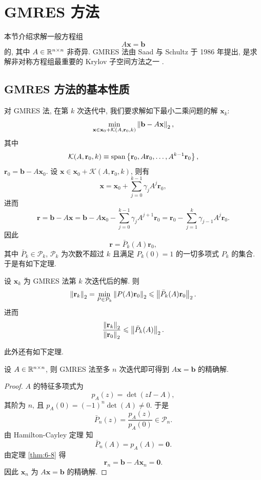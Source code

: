 \section{GMRES 方法}
\label{sec:6-5}

本节介绍求解一般方程组
\[
  A\mathbf{x}=\mathbf{b}
\]
的, 其中 $A\in\mathbb{R}^{n\times n}$ 非奇异. GMRES 法由 Saad 与 Schultz 于 1986 年提出, 是求解非对称方程组最重要的 Krylov 子空间方法之一 \cite{src:70,src:71}.

\subsection{GMRES 方法的基本性质}
\label{subsec:6-5-1}

对 GMRES 法, 在第 $k$ 次迭代中, 我们要求解如下最小二乘问题的解 $\mathbf{x}_k$:
\[
  \min_{\mathbf{x}\in\mathbf{x}_0+\mathcal{K}(A,\mathbf{r}_0,k)}
  \left\|\mathbf{b}-A\mathbf{x}\right\|_2,
\]
其中
\[
  \mathcal{K}(A,\mathbf{r}_0,k)
  \equiv\operatorname{span}\left\{\mathbf{r}_0,A\mathbf{r}_0,\ldots,A^{k-1}\mathbf{r}_0\right\},
\]
$\mathbf{r}_0=\mathbf{b}-A\mathbf{x}_0$. 设 $\mathbf{x}\in\mathbf{x}_0+\mathcal{K}(A,\mathbf{r}_0,k)$, 则有
\[
  \mathbf{x}=\mathbf{x}_0+\sum_{j=0}^{k-1}\gamma_jA^j\mathbf{r}_0,
\]
进而
\[
  \mathbf{r}=\mathbf{b}-A\mathbf{x}
  =\mathbf{b}-A\mathbf{x}_0-\sum_{j=0}^{k-1}\gamma_jA^{j+1}\mathbf{r}_0
  =\mathbf{r}_0-\sum_{j=1}^{k}\gamma_{j-1}A^j\mathbf{r}_0.
\]
因此
\[
  \mathbf{r}=\bar{P}_k(A)\mathbf{r}_0,
\]
其中 $\bar{P}_k\in\mathcal{P}_k$, $\mathcal{P}_k$ 为次数不超过 $k$ 且满足 $P_k(0)=1$ 的一切多项式 $P_k$ 的集合. 于是有如下定理.

\begin{theorem}
\label{thm:6-8}
设 $\mathbf{x}_k$ 为 GMRES 法第 $k$ 次迭代后的解. 则
\[
  \left\|\mathbf{r}_k\right\|_2=\min_{P\in\mathcal{P}_k}\left\|P(A)\mathbf{r}_0\right\|_2
  \leqslant\left\|\bar{P}_k(A)\mathbf{r}_0\right\|_2.
\]
进而
\[
  \frac{\left\|\mathbf{r}_k\right\|_2}{\left\|\mathbf{r}_0\right\|_2}
  \leqslant\left\|\bar{P}_k(A)\right\|_2.
\]
\end{theorem}

此外还有如下定理.

\begin{theorem}
\label{thm:6-9}
设 $A\in\mathbb{R}^{n\times n}$, 则 GMRES 法至多 $n$ 次迭代即可得到 $A\mathbf{x}=\mathbf{b}$ 的精确解.
\end{theorem}

\begin{proof}
$A$ 的特征多项式为
\[
  p_A(z)=\det(zI-A),
\]
其阶为 $n$, 且 $p_A(0)=(-1)^n\det(A)\neq0$. 于是
\[
  \bar{P}_n(z)=\frac{p_A(z)}{p_A(0)}\in\mathcal{P}_n.
\]
由 Hamilton-Cayley 定理 \cite{src:39} 知
\[
  \bar{P}_n(A)=p_A(A)=\mathbf{0}.
\]
由定理 \ref{thm:6-8} 得
\[
  \mathbf{r}_n=\mathbf{b}-A\mathbf{x}_n=\mathbf{0}.
\]
因此 $\mathbf{x}_n$ 为 $A\mathbf{x}=\mathbf{b}$ 的精确解.
\end{proof}

